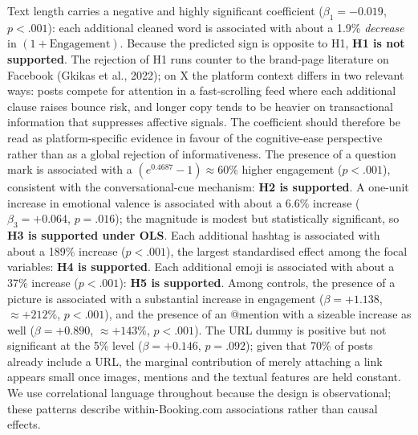 \documentclass[12pt,a4paper]{article}
\begin{document}
Text length carries a negative and highly significant coefficient ($\beta_1=-0.019$, $p<.001$): each additional cleaned word is associated with about a 1.9\% \emph{decrease} in $(1+\text{Engagement})$. Because the predicted sign is opposite to H1, \textbf{H1 is not supported}. The rejection of H1 runs counter to the brand-page literature on Facebook (Gkikas et al., 2022); on X the platform context differs in two relevant ways: posts compete for attention in a fast-scrolling feed where each additional clause raises bounce risk, and longer copy tends to be heavier on transactional information that suppresses affective signals. The coefficient should therefore be read as platform-specific evidence in favour of the cognitive-ease perspective rather than as a global rejection of informativeness. The presence of a question mark is associated with a $(e^{0.4687}-1)\approx 60\%$ higher engagement ($p<.001$), consistent with the conversational-cue mechanism: \textbf{H2 is supported}. A one-unit increase in emotional valence is associated with about a 6.6\% increase ($\beta_3=+0.064$, $p=.016$); the magnitude is modest but statistically significant, so \textbf{H3 is supported under OLS}. Each additional hashtag is associated with about a 189\% increase ($p<.001$), the largest standardised effect among the focal variables: \textbf{H4 is supported}. Each additional emoji is associated with about a 37\% increase ($p<.001$): \textbf{H5 is supported}. Among controls, the presence of a picture is associated with a substantial increase in engagement ($\beta=+1.138$, $\approx +212\%$, $p<.001$), and the presence of an @mention with a sizeable increase as well ($\beta=+0.890$, $\approx +143\%$, $p<.001$). The URL dummy is positive but not significant at the 5\% level ($\beta=+0.146$, $p=.092$); given that 70\% of posts already include a URL, the marginal contribution of merely attaching a link appears small once images, mentions and the textual features are held constant. We use correlational language throughout because the design is observational; these patterns describe within-Booking.com associations rather than causal effects.
\end{document}
